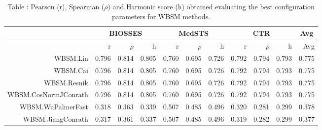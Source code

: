 \begin{table}[!h]
\centering
\caption{Table \label{table:Bestconfiguration_WBSM}: Pearson (r), Spearman ($\rho$) and Harmonic score (h) obtained evaluating the best configuration parameters for WBSM methods.} 
\begingroup\tiny
\begin{tabular}{rrrrrrrrrrr}
  \hline \multicolumn{1}{c}{ } & \multicolumn{3}{c}{BIOSSES} & \multicolumn{3}{c}{MedSTS} & \multicolumn{3}{c}{CTR} & \multicolumn{1}{c}{Avg} \\  \hline
 & r & $\rho$ & h & r & $\rho$ & h & r & $\rho$ & h & Avg \\ 
  \hline
WBSM.Lin & 0.796 & 0.814 & 0.805 & 0.760 & 0.695 & 0.726 & 0.792 & 0.794 & 0.793 & 0.775 \\ 
  WBSM.Cai & 0.796 & 0.814 & 0.805 & 0.760 & 0.695 & 0.726 & 0.792 & 0.794 & 0.793 & 0.775 \\ 
  WBSM.Resnik & 0.796 & 0.814 & 0.805 & 0.760 & 0.695 & 0.726 & 0.792 & 0.794 & 0.793 & 0.775 \\ 
  WBSM.CosNormJConrath & 0.796 & 0.814 & 0.805 & 0.760 & 0.695 & 0.726 & 0.792 & 0.794 & 0.793 & 0.775 \\ 
  WBSM.WuPalmerFast & 0.318 & 0.363 & 0.339 & 0.507 & 0.485 & 0.496 & 0.320 & 0.281 & 0.299 & 0.378 \\ 
  WBSM.JiangConrath & 0.317 & 0.361 & 0.337 & 0.507 & 0.485 & 0.496 & 0.319 & 0.282 & 0.299 & 0.377 \\ 
   \hline
\end{tabular}
\endgroup
\end{table}

